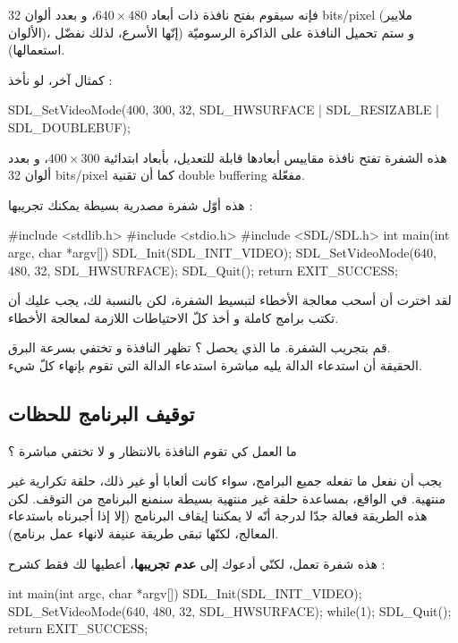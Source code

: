 فإنه سيقوم بفتح نافذة ذات أبعاد
$640 \times 480$،
 و بعدد ألوان
\textenglish{32 bits/pixel}
(ملايير الألوان)، و ستم تحميل النافذة على الذاكرة الرسوميّة (إنّها الأسرع، لذلك نفضّل استعمالها).

كمثال آخر، لو نأخذ :

\begin{Csource}
SDL_SetVideoMode(400, 300, 32, SDL_HWSURFACE | SDL_RESIZABLE | SDL_DOUBLEBUF);
\end{Csource}

هذه الشفرة تفتح نافذة مقاييس  أبعادها قابلة للتعديل، بأبعاد ابتدائية 
$400 \times 300$،
و بعدد ألوان 
\textenglish{32 bits/pixel}
كما أن تقنية 
\textenglish{double buffering}
مفعّلة.

هذه أوّل شفرة مصدرية بسيطة يمكنك تجريبها :

\begin{Csource}
#include <stdlib.h>
#include <stdio.h>
#include <SDL/SDL.h>
int main(int argc, char *argv[])
{
	SDL_Init(SDL_INIT_VIDEO);
	SDL_SetVideoMode(640, 480, 32, SDL_HWSURFACE);
	SDL_Quit();
	return EXIT_SUCCESS;
}
\end{Csource}

لقد اخترت أن أسحب معالجة الأخطاء لتبسيط الشفرة، لكن بالنسبة لك، يجب عليك أن تكتب برامج كاملة و أخذ كلّ الاحتياطات اللازمة لمعالجة الأخطاء.

قم بتجريب الشفرة.
ما الذي يحصل ؟ تظهر النافذة و تختفي بسرعة البرق.\\
الحقيقة أن استدعاء الدالة
يليه مباشرة استدعاء الدالة
التي تقوم بإنهاء كلّ شيء.

\subsection{توقيف البرنامج للحظات}

\begin{question}
ما العمل كي تقوم النافذة بالانتظار و لا تختفي مباشرة ؟
\end{question}

يجب أن نفعل ما تفعله جميع البرامج، سواء كانت ألعابا أو غير ذلك، حلقة تكرارية غير منتهية. في الواقع، بمساعدة حلقة غير منتهية بسيطة سنمنع البرنامج من التوقف. لكن هذه الطريقة فعالة جدّا لدرجة أنّه لا يمكننا إيقاف البرنامج (إلا إذا أجبرناه باستدعاء المعالج، لكنّها تبقى طريقة عنيفة لانهاء عمل برنامج).

هذه شفرة تعمل، لكنّي أدعوك إلى
\textbf{عدم تجريبها}،
أعطيها لك فقط كشرح :

\begin{Csource}
int main(int argc, char *argv[])
{
	SDL_Init(SDL_INIT_VIDEO);
	SDL_SetVideoMode(640, 480, 32, SDL_HWSURFACE);
	while(1);
	SDL_Quit();
	return EXIT_SUCCESS;
}
\end{Csource}

